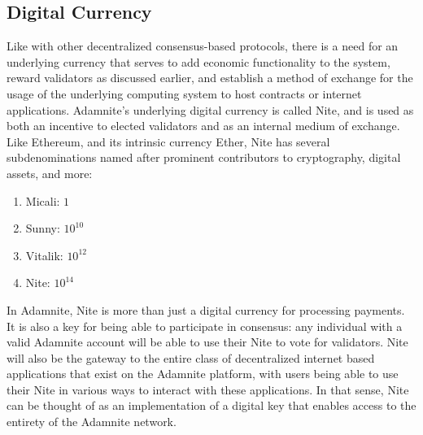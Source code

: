 \documentclass[conference]{IEEEtran}
\begin{document}
\subsection{Digital Currency}
Like with other decentralized consensus-based protocols, there is a need for an underlying currency that serves to add economic functionality to the system, reward validators as discussed earlier, and establish a method of exchange for the usage of the underlying computing system to host contracts or internet applications. Adamnite's underlying digital currency is called Nite, and is used as both an incentive to elected validators and as an internal medium of exchange. Like Ethereum, and its intrinsic currency Ether, Nite has several subdenominations named after prominent contributors to cryptography, digital assets, and more:
\begin{enumerate}
    \item {Micali}: $1$
    \item {Sunny}:  $10^{10}$
    \item {Vitalik}: $10^{12}$
    \item {Nite}: $10^{14}$

\end{enumerate}

In Adamnite, Nite is more than just a digital currency for processing payments. It is also a key for being able to participate in consensus: any individual with a valid Adamnite account will be able to use their Nite to vote for validators. Nite will also be the gateway to the entire class of decentralized internet based applications that exist on the Adamnite platform, with users being able to use their Nite in various ways to interact with these applications. In that sense, Nite can be thought of as an implementation of a digital key that enables access to the entirety of the Adamnite network.
\end{document}

